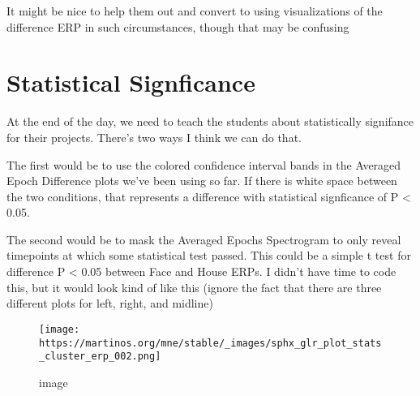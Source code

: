 \documentclass[11pt]{article}
\makeatletter
\def\maxwidth{\ifdim\Gin@nat@width>\linewidth\linewidth
    \else\Gin@nat@width\fi}
\let\Oldincludegraphics\includegraphics
\renewcommand{\includegraphics}[1]{\Oldincludegraphics[width=.8\maxwidth]{#1}}
\makeatother
\begin{document}
It might be nice to help them out and convert to using visualizations of
the difference ERP in such circumstances, though that may be confusing

    \section{Statistical Signficance}\label{statistical-signficance}

At the end of the day, we need to teach the students about statistically
signifance for their projects. There's two ways I think we can do that.

The first would be to use the colored confidence interval bands in the
Averaged Epoch Difference plots we've been using so far. If there is
white space between the two conditions, that represents a difference
with statistical signficance of P \textless{} 0.05.

The second would be to mask the Averaged Epochs Spectrogram to only
reveal timepoints at which some statistical test passed. This could be a
simple t test for difference P \textless{} 0.05 between Face and House
ERPs. I didn't have time to code this, but it would look kind of like
this (ignore the fact that there are three different plots for left,
right, and midline)

\begin{figure}
\centering
\texttt{[image: https://martinos.org/mne/stable/\_images/sphx\_glr\_plot\_stats\_cluster\_erp\_002.png]}
\caption{image}
\end{figure}


    
    
    
    
\end{document}
